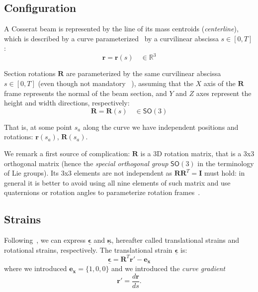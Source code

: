 \documentclass[review]{elsarticle}
\def\avect#1{{\boldsymbol{#1}}}
\def\amatr#1{{\boldsymbol{#1}}}
\begin{document}
\subsection{Configuration}

A Cosserat beam is represented by the line of its mass centroids (\emph{centerline}), which is described by a curve parameterized~\cite{Weeger2017IGA} by a curvilinear abscissa $s \in [0,T] $:
%
\begin{equation}
	\avect{r} = \avect{r}(s) \quad \in \mathbb{R}^3
\end{equation}

Section rotations $\amatr{R}$ are parameterized by  the same curvilinear abscissa $s \in [0,T] $ (even though not mandatory~\cite{Auricchio2013IGA} ), assuming that the $X$ axis of the $\amatr{R}$ frame represents the normal of the beam section, and $Y$ and $Z$ 
axes represent the height and width directions, respectively:
%
\begin{equation}
	\amatr{R} = \amatr{R}(s) \quad \in \mathsf{SO}(3)
\end{equation}

That is, at some point $s_a$ along the curve we have independent positions and rotations: 
$\avect{r}(s_a)$, $\amatr{R}(s_a)$.

We remark a first source of complication: $\amatr{R}$ is a 3D rotation matrix, that is a 3x3 orthogonal matrix (hence
the \emph{special orthogonal group} $\mathsf{SO}(3)$ in the terminology of Lie groups). Its 3x3 elements are not independent as $\amatr{R}\amatr{R}^T=\amatr{I}$ must hold: in general it is better to avoid using all nine elements of such matrix and use quaternions or rotation angles to parameterize rotation frames~\cite{Lang2011CosseractRods}. 


\subsection{Strains}

Following~\cite{Simo1986finitestrain}, we can express  
$\underline{\avect{\epsilon}}$ and $\underline{\avect{\kappa}}$, hereafter called translational strains and rotational strains, respectively. 
The translational strain $\underline{\avect{\epsilon}}$ is:
%
\begin{equation}
	\underline{\avect{\epsilon}} = \amatr{R}^T \avect{r}' - \avect{e_x}
	\label{eq:epsilon}
\end{equation}
%
where we introduced $\avect{e_x} = \{1,0,0\}$ and we introduced the \emph{curve gradient} 
%
\begin{equation}
\avect{r}' = \frac{d\avect{r}}{ds}. 
\end{equation}
\end{document}
